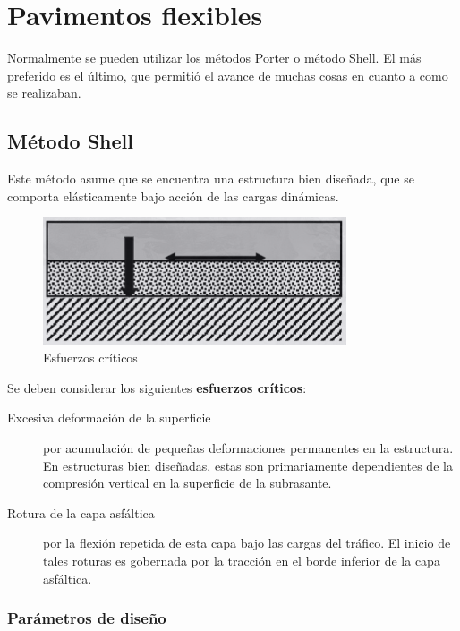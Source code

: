 \documentclass[../main.tex]{subfiles}
\begin{document}
\section{Pavimentos flexibles}

Normalmente se pueden utilizar los métodos Porter o método Shell. El más
preferido es el último, que permitió el avance de muchas cosas en cuanto a 
como se realizaban.

\subsection{Método Shell}

Este método asume que se encuentra una estructura bien diseñada, que se comporta
elásticamente bajo acción de las cargas dinámicas. 

\begin{figure}[htpb]
  \centering
  \includegraphics[width=0.8\textwidth]{../images/20210527/shell}
  \caption{Esfuerzos críticos}
  \label{fig:shell}
\end{figure}

Se deben considerar los siguientes \textbf{esfuerzos críticos}:

\begin{description}
  \item[Excesiva deformación de la superficie] por acumulación de pequeñas 
    deformaciones permanentes en la estructura. En estructuras bien diseñadas,
    estas son primariamente dependientes de la compresión vertical en la 
    superficie de la subrasante.
  \item[Rotura de la capa asfáltica] por la flexión repetida de esta capa bajo
    las cargas del tráfico. El inicio de tales roturas es gobernada por la 
    tracción en el borde inferior de la capa asfáltica.
\end{description}

\subsubsection{Parámetros de diseño}
\end{document}

